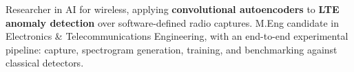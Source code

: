 Researcher in AI for wireless, applying \textbf{convolutional autoencoders} to \textbf{LTE anomaly detection} over software-defined radio captures. M.Eng candidate in Electronics \& Telecommunications Engineering, with an end-to-end experimental pipeline: capture, spectrogram generation, training, and benchmarking against classical detectors.
